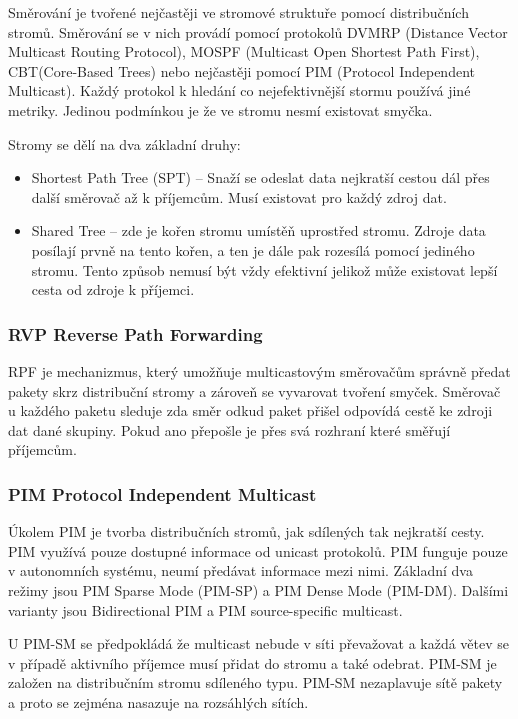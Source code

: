 Směrování je tvořené nejčastěji ve stromové struktuře pomocí distribučních stromů.
Směrování se v nich provádí pomocí protokolů DVMRP (Distance Vector Multicast Routing Protocol), MOSPF (Multicast Open Shortest Path First), CBT(Core-Based Trees) nebo nejčastěji pomocí PIM (Protocol Independent Multicast).
Každý protokol k hledání co nejefektivnější stormu používá jiné metriky.
Jedinou podmínkou je že ve stromu nesmí existovat smyčka.

Stromy se dělí na dva základní druhy:

\begin{itemize}[noitemsep]
    \item Shortest Path Tree (SPT) -- Snaží se odeslat data nejkratší cestou dál přes další směrovač až k příjemcům.
    Musí existovat pro každý zdroj dat.
    \item Shared Tree -- zde je kořen stromu umístěň uprostřed stromu.
    Zdroje data posílají prvně na tento kořen, a ten je dále pak rozesílá pomocí jediného stromu.
    Tento způsob nemusí být vždy efektivní jelikož může existovat lepší cesta od zdroje k příjemci.
\end{itemize}

\subsubsection{RVP Reverse Path Forwarding}

RPF je mechanizmus, který umožňuje multicastovým směrovačům správně předat pakety skrz distribuční stromy a zároveň se vyvarovat tvoření smyček.
Směrovač u každého paketu sleduje zda směr odkud paket přišel odpovídá cestě ke zdroji dat dané skupiny.
Pokud ano přepošle je přes svá rozhraní které směřují příjemcům.

\subsubsection{PIM Protocol Independent Multicast}

Úkolem PIM je tvorba distribučních stromů, jak sdílených tak nejkratší cesty.
PIM využívá pouze dostupné informace od unicast protokolů.
PIM funguje pouze v autonomních systému, neumí předávat informace mezi nimi.
Základní dva režimy jsou PIM Sparse Mode (PIM-SP) a PIM Dense Mode (PIM-DM). Dalšími varianty jsou Bidirectional PIM a PIM source-specific multicast.

U PIM-SM se předpokládá že multicast nebude v síti převažovat a každá větev se v případě aktivního příjemce musí přidat do stromu a také odebrat.
PIM-SM je založen na distribučním stromu sdíleného typu.
PIM-SM nezaplavuje sítě pakety a proto se zejména nasazuje na rozsáhlých sítích.


